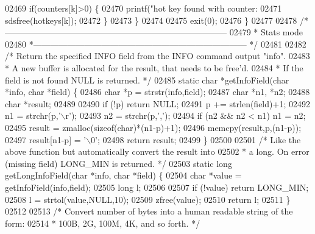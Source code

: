 \begin{DoxyCode}
{{{{{{{{{{{{{{{{{{{{{{{{{{{{{{{{{{{{{{{{{{{{{{{{{{{{{{{{{{{{{{{{{{{{{{{{{{{{{{{{{{02469         \textcolor{keywordflow}{if}(counters[k]>0) \{
02470             printf(\textcolor{stringliteral}{"hot key found with counter: %
02471             sdsfree(hotkeys[k]);
02472         \}
02473     \}
02474 
02475     exit(0);
02476 \}
02477 
02478 \textcolor{comment}{/*------------------------------------------------------------------------------}
02479 \textcolor{comment}{ * Stats mode}
02480 \textcolor{comment}{ *--------------------------------------------------------------------------- */}
02481 
02482 \textcolor{comment}{/* Return the specified INFO field from the INFO command output "info".}
02483 \textcolor{comment}{ * A new buffer is allocated for the result, that needs to be free'd.}
02484 \textcolor{comment}{ * If the field is not found NULL is returned. */}
02485 \textcolor{keyword}{static} \textcolor{keywordtype}{char} *getInfoField(\textcolor{keywordtype}{char} *info, \textcolor{keywordtype}{char} *field) \{
02486     \textcolor{keywordtype}{char} *p = strstr(info,field);
02487     \textcolor{keywordtype}{char} *n1, *n2;
02488     \textcolor{keywordtype}{char} *result;
02489 
02490     \textcolor{keywordflow}{if} (!p) \textcolor{keywordflow}{return} NULL;
02491     p += strlen(field)+1;
02492     n1 = strchr(p,\textcolor{stringliteral}{'\(\backslash\)r'});
02493     n2 = strchr(p,\textcolor{stringliteral}{','});
02494     \textcolor{keywordflow}{if} (n2 && n2 < n1) n1 = n2;
02495     result = zmalloc(\textcolor{keyword}{sizeof}(\textcolor{keywordtype}{char})*(n1-p)+1);
02496     memcpy(result,p,(n1-p));
02497     result[n1-p] = \textcolor{stringliteral}{'\(\backslash\)0'};
02498     \textcolor{keywordflow}{return} result;
02499 \}
02500 
02501 \textcolor{comment}{/* Like the above function but automatically convert the result into}
02502 \textcolor{comment}{ * a long. On error (missing field) LONG\_MIN is returned. */}
02503 \textcolor{keyword}{static} \textcolor{keywordtype}{long} getLongInfoField(\textcolor{keywordtype}{char} *info, \textcolor{keywordtype}{char} *field) \{
02504     \textcolor{keywordtype}{char} *value = getInfoField(info,field);
02505     \textcolor{keywordtype}{long} l;
02506 
02507     \textcolor{keywordflow}{if} (!value) \textcolor{keywordflow}{return} LONG\_MIN;
02508     l = strtol(value,NULL,10);
02509     zfree(value);
02510     \textcolor{keywordflow}{return} l;
02511 \}
02512 
02513 \textcolor{comment}{/* Convert number of bytes into a human readable string of the form:}
02514 \textcolor{comment}{ * 100B, 2G, 100M, 4K, and so forth. */}
}}}}}}}}}}}}}}}}}}}}}}}}}}}}}}}}}}}}}}}}}}}}}}}}}}}}}}}}}}}}}}}}}}}}}}}}}}}}}}}}}}}
\end{DoxyCode}
